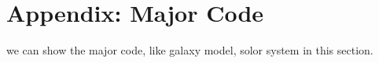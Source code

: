 \documentclass[a4paper,12pt]{article}
\begin{document}
\newpage
{}
\begin{thebibliography}{99} 

\end{thebibliography}



\newpage 
\section*{Appendix: Major Code} 
we can show the major code, like galaxy model, solor system in this section.

\end{document}
